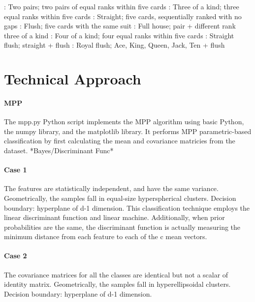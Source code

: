 \documentclass{article}
\begin{document}
: Two pairs; two pairs of equal ranks within five cards
: Three of a kind; three equal ranks within five cards
: Straight; five cards, sequentially ranked with no gaps
: Flush; five cards with the same suit
: Full house; pair + different rank three of a kind
: Four of a kind; four equal ranks within five cards
: Straight flush; straight + flush
: Royal flush; {Ace, King, Queen, Jack, Ten} + flush
\newpage


\section*{Technical Approach}
\paragraph{MPP} 
The mpp.py Python script implements the MPP algorithm using basic Python, the numpy library,
and the matplotlib library.  It performs MPP parametric-based classification by first
calculating the mean and covariance matricies from the dataset.
*Bayes/Discriminant Func*
\paragraph{Case 1}
The features are statistically independent, and have the same variance.  
Geometrically, the samples fall in equal-size hyperspherical clusters.  
Decision boundary: hyperplane of d-1 dimension.  This classification technique employs the
linear discriminant function and linear machine.  Additionally, when prior probabilities are
the same, the discriminant function is actually measuring the minimum distance from each
feature to each of the c mean vectors.
\paragraph{Case 2}
The covariance matrices for all the classes are identical but not a scalar of identity matrix.
Geometrically, the samples fall in hyperellipsoidal clusters.  
Decision boundary: hyperplane of d-1 dimension.
\end{document}
